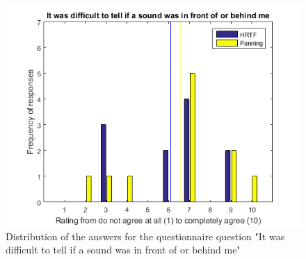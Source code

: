\documentclass[journal]{IEEEtran}
\begin{document}
\begin{appendices}
\begin{figure}[h!]
  \centering
    \includegraphics[scale=0.6]{graphics/qq5.png}
   \caption{Distribution of the answers for the questionnaire question "It was difficult to tell if a sound was in front of or behind me"}
  \label{fig:plt11}
\end{figure}


\end{appendices}
\pagebreak



\end{document}
